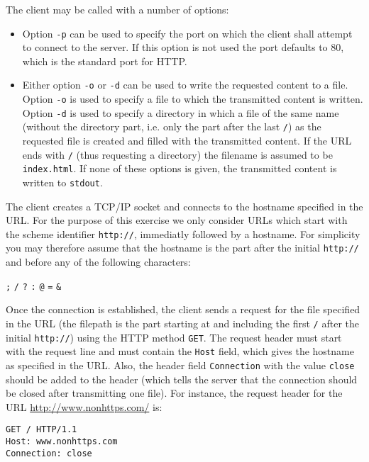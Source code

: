 \vspace{-3mm}

The client may be called with a number of options:
\begin{itemize}
\item Option \texttt{-p} can be used to specify the port
on which the client shall attempt to connect to the server.
If this option is not used the port defaults to 80,
which is the standard port for HTTP.
\item Either option \texttt{-o} or \texttt{-d} can be used
to write the requested content to a file.
Option \texttt{-o} is used to specify a file
to which the transmitted content is written.
Option \texttt{-d} is used to specify a directory
in which a file of the same name
(without the directory part, i.e. only the part after the last \verb|/|)
as the requested file is created
and filled with the transmitted content.
If the URL ends with \verb|/| (thus requesting a directory)
the filename is assumed to be \verb|index.html|.
If none of these options is given,
the transmitted content is written to \verb|stdout|.
\end{itemize}

The client creates a TCP/IP socket
and connects to the hostname specified in the URL.
For the purpose of this exercise we only consider URLs
which start with the scheme identifier \verb|http://|,
immediatly followed by a hostname.
For simplicity you may therefore assume that
the hostname is the part after the initial \verb|http://|
and before any of the following characters:

\texttt{;} \texttt{/} \texttt{?} \texttt{:} \texttt{@} \texttt{=} \texttt{\&}

Once the connection is established,
the client sends a request for the file specified in the URL
(the filepath is the part starting at and including the first \texttt{/}
after the initial \verb|http://|)
using the HTTP method \texttt{GET}.
The request header must start with the request line
and must contain the \texttt{Host} field,
which gives the hostname as specified in the URL.
Also, the header field \verb|Connection| with the value \verb|close|
should be added to the header
(which tells the server that the connection should be closed after transmitting one file).
For instance, the request header for the URL
\url{http://www.nonhttps.com/} is:

\begin{verbatim}
GET / HTTP/1.1
Host: www.nonhttps.com
Connection: close
\end{verbatim}

